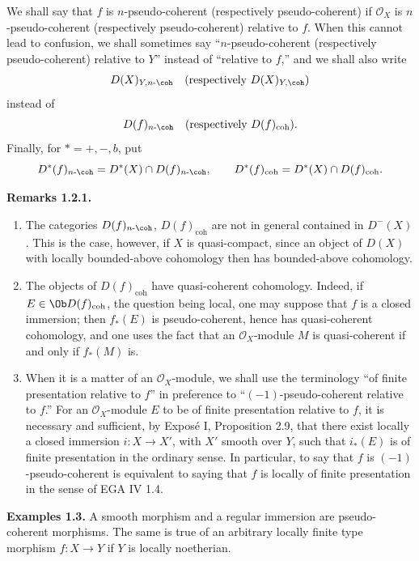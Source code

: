 We shall say that \(f\) is \(n\)-pseudo-coherent (respectively pseudo-coherent) if \(\mathcal O_X\) is \(n\)-pseudo-coherent (respectively pseudo-coherent) relative to \(f\). When this cannot lead to confusion, we shall sometimes say ``\(n\)-pseudo-coherent (respectively pseudo-coherent) relative to \(Y\)'' instead of ``relative to \(f\),'' and we shall also write
\[
  D(X)_{Y,n\text{-}\coh}\quad(\text{respectively }D(X)_{Y,\coh})
\]
instead of
\[
  D(f)_{n\text{-}\coh}\quad(\text{respectively }D(f)_{\mathrm{coh}}).
\]
Finally, for \(*=+,-,b\), put
\[
  D^*(f)_{n\text{-}\coh}=D^*(X)\cap D(f)_{n\text{-}\coh},
  \qquad
  D^*(f)_{\mathrm{coh}}=D^*(X)\cap D(f)_{\mathrm{coh}}.
\]

\textbf{Remarks 1.2.1.}
\begin{enumerate}[label=\alph*)]
\item The categories \(D(f)_{n\text{-}\coh}\), \(D(f)_{\mathrm{coh}}\) are not in general contained in \(D^{-}(X)\). This is the case, however, if \(X\) is quasi-compact, since an object of \(D(X)\) with locally bounded-above cohomology then has bounded-above cohomology.

\item The objects of \(D(f)_{\mathrm{coh}}\) have quasi-coherent cohomology. Indeed, if \(E\in \Ob D(f)_{\mathrm{coh}}\), the question being local, one may suppose that \(f\) is a closed immersion; then \(f_*(E)\) is pseudo-coherent, hence has quasi-coherent cohomology, and one uses the fact that an \(\mathcal O_X\)-module \(M\) is quasi-coherent if and only if \(f_*(M)\) is.

\item When it is a matter of an \(\mathcal O_X\)-module, we shall use the terminology ``of finite presentation relative to \(f\)'' in preference to ``\((-1)\)-pseudo-coherent relative to \(f\).'' For an \(\mathcal O_X\)-module \(E\) to be of finite presentation relative to \(f\), it is necessary and sufficient, by Exposé I, Proposition 2.9, that there exist locally a closed immersion \(i:X\to X'\), with \(X'\) smooth over \(Y\), such that \(i_*(E)\) is of finite presentation in the ordinary sense. In particular, to say that \(f\) is \((-1)\)-pseudo-coherent is equivalent to saying that \(f\) is locally of finite presentation in the sense of EGA IV 1.4.
\end{enumerate}

\textbf{Examples 1.3.} A smooth morphism and a regular immersion are pseudo-coherent morphisms. The same is true of an arbitrary locally finite type morphism \(f:X\to Y\) if \(Y\) is locally noetherian.

